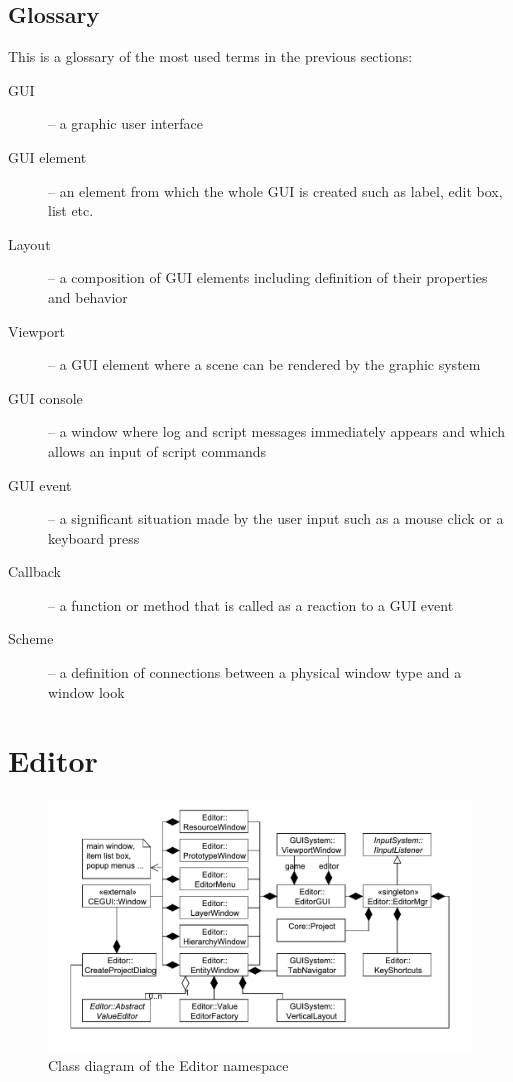 \documentclass[a4paper, 12pt]{report}
\begin{document}
\section{Glossary}
This is a glossary of the most used terms in the previous sections:

\begin{description}
  \item[GUI] -- a graphic user interface
  \item[GUI element] -- an element from which the whole GUI is created such as label, edit box, list etc.
  \item[Layout] -- a composition of GUI elements including definition of their properties and behavior
  \item[Viewport] -- a GUI element where a scene can be rendered by the graphic system
  \item[GUI console] -- a window where log and script messages immediately appears and which allows an input of script commands
  \item[GUI event] -- a significant situation made by the user input such as a mouse click or a keyboard press
  \item[Callback] -- a function or method that is called as a reaction to a GUI event
  \item[Scheme] -- a definition of connections between a physical window type and a window look
\end{description}

\chapter{Editor}

\begin{figure}[htbp]
	\centering
		\includegraphics[width=1\textwidth]{EditorClassDiagram.pdf}
	\caption{Class diagram of the Editor namespace}
	\label{fig:editor-diagram}
\end{figure}
\end{document}
